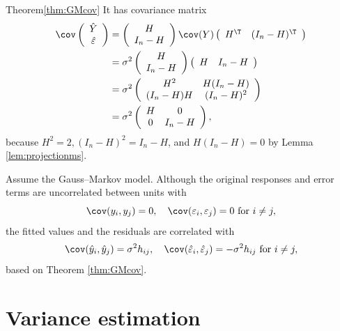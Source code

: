 \begin{myproof}{Theorem}{\ref{thm:GMcov}}
It has covariance matrix
\begin{align*}
\cov\left(\begin{array}{c}
\hat{Y}\\
\hat{\varepsilon}
\end{array}\right) & =\left(\begin{array}{c}
H\\
I_{n}-H
\end{array}\right)\cov(Y)\left(\begin{array}{cc}
H^{\T} & (I_{n}-H)^{\T}\end{array}\right)\\
 & =\sigma^{2}\left(\begin{array}{c}
H\\
I_{n}-H
\end{array}\right)\left(\begin{array}{cc}
H & I_{n}-H\end{array}\right)\\
 & =\sigma^{2}\left(\begin{array}{cc}
H^{2} & H(I_{n}-H)\\
(I_{n}-H)H & (I_{n}-H)^{2}
\end{array}\right)\\
 & =\sigma^{2}\left(\begin{array}{cc}
H & 0\\
0 & I_{n}-H
\end{array}\right),
\end{align*}
because $H^2=2, (I_{n}-H)^{2} = I_{n}-H$, and $H(I_{n}-H) = 0$ by Lemma \ref{lem:projectionms}. 
\end{myproof}

Assume the Gauss--Markov model. 
Although the original responses and error terms are uncorrelated between
units with 
$$
\cov(y_i, y_j)=0,\quad 
\cov(\varepsilon_i, \varepsilon_j)=0    \text{ for } i\neq j,
$$ 
the fitted values and the residuals are correlated with 
$$
\cov(\hat{y}_i, \hat{y}_j) 
= \sigma^2 h_{ij},\quad 
\cov(\hat{\varepsilon}_i, \hat{\varepsilon}_j) 
=   - \sigma^2 h_{ij}   \text{ for } i\neq j,
$$ 
based on Theorem \ref{thm:GMcov}. 




\section{Variance estimation}

